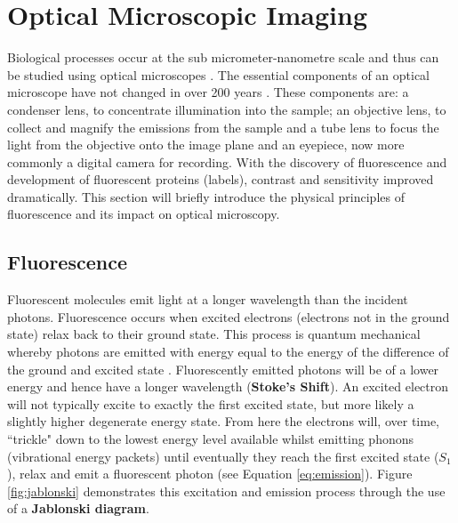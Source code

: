 \section{Optical Microscopic Imaging}

Biological processes occur at the sub micrometer-nanometre scale and thus can be studied using optical microscopes \cite{Murphy2012e}. %
The essential components of an optical microscope have not changed in over 200 years \cite{Bradbury1998,Masters2001b}. These components are: a condenser lens, to concentrate illumination into the sample; an objective lens, to collect and magnify the emissions from the sample and a tube lens to focus the light from the objective onto the image plane and an eyepiece, now more commonly a digital camera for recording. With the discovery of fluorescence and development of fluorescent proteins (labels), contrast and sensitivity improved dramatically. This section will briefly introduce the physical principles of fluorescence and its impact on optical microscopy.

\subsection{Fluorescence}

Fluorescent molecules emit light at a longer wavelength than the incident photons. Fluorescence occurs when excited electrons (electrons not in the ground state) relax back to their ground state. This process is quantum mechanical whereby photons are emitted with energy equal to the energy of the difference of the ground and excited state \cite{Lakowicz2007}.
Fluorescently emitted photons will be of a lower energy and hence have a longer wavelength (\textbf{Stoke's Shift}). An excited electron will not typically excite to exactly the first excited state, but more likely a slightly higher degenerate energy state. From here the electrons will, over time, ``trickle" down to the lowest energy level available whilst emitting phonons (vibrational energy packets) until eventually they reach the first excited state ($S_1$), relax and emit a fluorescent photon (see Equation \eqref{eq:emission}). Figure \ref{fig:jablonski} demonstrates this excitation and emission process through the use of a \textbf{Jablonski diagram}.

